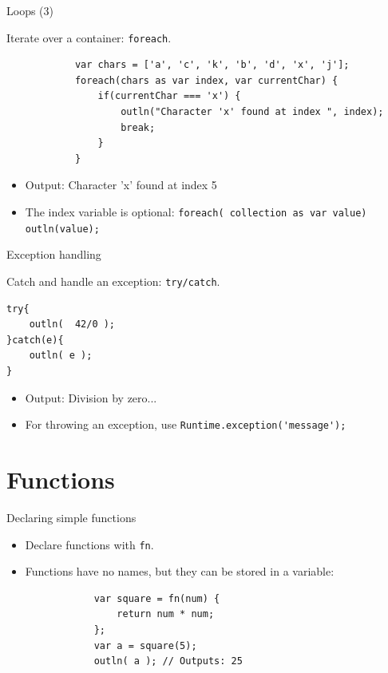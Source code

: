 \documentclass[ucs,9pt]{beamer}
\begin{document}
\begin{frame}[fragile]{Loops (3)}
	\begin{block}{Iterate over a container: \lstinline!foreach!.}
		\small	
		\begin{lstlisting}
			var chars = ['a', 'c', 'k', 'b', 'd', 'x', 'j'];
			foreach(chars as var index, var currentChar) {
			    if(currentChar === 'x') {
			        outln("Character 'x' found at index ", index);
			        break;
			    }
			}
		\end{lstlisting}
		\normalsize
	\end{block}
	\begin{itemize}	
	\item Output: Character 'x' found at index 5
	\item The index variable is optional:
	 \lstinline!foreach( collection as var value) outln(value);!
	\end{itemize}
\end{frame}


\begin{frame}[fragile]{Exception handling}
	\begin{block}{Catch and handle an exception: \lstinline!try/catch!.}
		\small	
		\begin{lstlisting}
try{
    outln(  42/0 );
}catch(e){
    outln( e );
}
		\end{lstlisting}
		\normalsize
	\end{block}
	\begin{itemize}	
	\item Output: Division by zero...
	\item For throwing an exception, use \lstinline!Runtime.exception('message');!
	\end{itemize}
\end{frame}

\section{Functions}
\begin{frame}[fragile]{Declaring simple functions}
	\begin{itemize}
	\item Declare functions with \lstinline!fn!.
	\item Functions have no names, but they can be stored in a variable:
		\begin{lstlisting}
			var square = fn(num) {
			    return num * num;
			};
			var a = square(5);
			outln( a ); // Outputs: 25
		\end{lstlisting}
		\end{itemize}
	\end{frame}
\end{document}

